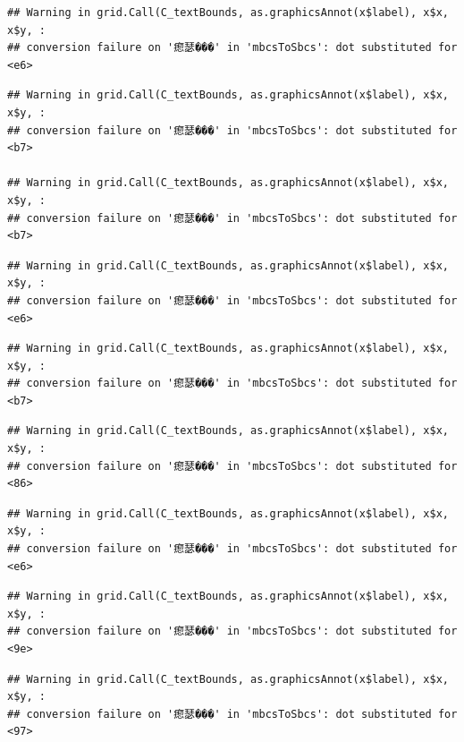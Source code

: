 \documentclass[
]{article}
\begin{document}
\begin{verbatim}
## Warning in grid.Call(C_textBounds, as.graphicsAnnot(x$label), x$x, x$y, :
## conversion failure on '瘛瑟���' in 'mbcsToSbcs': dot substituted for <e6>
\end{verbatim}

\begin{verbatim}
## Warning in grid.Call(C_textBounds, as.graphicsAnnot(x$label), x$x, x$y, :
## conversion failure on '瘛瑟���' in 'mbcsToSbcs': dot substituted for <b7>

## Warning in grid.Call(C_textBounds, as.graphicsAnnot(x$label), x$x, x$y, :
## conversion failure on '瘛瑟���' in 'mbcsToSbcs': dot substituted for <b7>
\end{verbatim}

\begin{verbatim}
## Warning in grid.Call(C_textBounds, as.graphicsAnnot(x$label), x$x, x$y, :
## conversion failure on '瘛瑟���' in 'mbcsToSbcs': dot substituted for <e6>
\end{verbatim}

\begin{verbatim}
## Warning in grid.Call(C_textBounds, as.graphicsAnnot(x$label), x$x, x$y, :
## conversion failure on '瘛瑟���' in 'mbcsToSbcs': dot substituted for <b7>
\end{verbatim}

\begin{verbatim}
## Warning in grid.Call(C_textBounds, as.graphicsAnnot(x$label), x$x, x$y, :
## conversion failure on '瘛瑟���' in 'mbcsToSbcs': dot substituted for <86>
\end{verbatim}

\begin{verbatim}
## Warning in grid.Call(C_textBounds, as.graphicsAnnot(x$label), x$x, x$y, :
## conversion failure on '瘛瑟���' in 'mbcsToSbcs': dot substituted for <e6>
\end{verbatim}

\begin{verbatim}
## Warning in grid.Call(C_textBounds, as.graphicsAnnot(x$label), x$x, x$y, :
## conversion failure on '瘛瑟���' in 'mbcsToSbcs': dot substituted for <9e>
\end{verbatim}

\begin{verbatim}
## Warning in grid.Call(C_textBounds, as.graphicsAnnot(x$label), x$x, x$y, :
## conversion failure on '瘛瑟���' in 'mbcsToSbcs': dot substituted for <97>
\end{verbatim}
\end{document}
